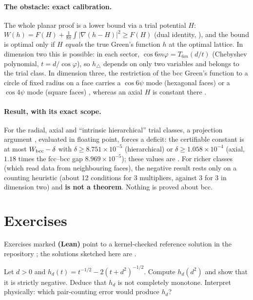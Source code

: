 \paragraph{The obstacle: exact calibration.} The whole planar proof is a lower bound via a trial potential $H$:
$W(h)=F(H)+\frac1{8\pi}\int|\nabla(h-H)|^2\ge F(H)$ (dual identity, \tierC), and the bound is optimal only if
$H$ \emph{equals} the true Green's function $h$ at the optimal lattice. In dimension two this is possible: in each sector,
$\cos6m\varphi=T_{6m}(d/t)$ (Chebyshev polynomial, $t=d/\cos\varphi$), so $h_\triangle$ depends on only two
variables and belongs to the trial class. In dimension three, the restriction of the bcc Green's function to a circle
of fixed radius on a face carries a $\cos6\psi$ mode (hexagonal faces) or a $\cos4\psi$ mode (square faces) \tierX, whereas
an axial $H$ is constant there \tierC.

\paragraph{Result, with its exact scope.} For the radial, axial and ``intrinsic hierarchical'' trial classes,
a projection argument \tierC, evaluated in floating point, forces a deficit: the certifiable constant is at most
$W_{\rm bcc}-\delta$ with $\delta\ge8.751\times10^{-5}$ (hierarchical) or $\delta\ge1.058\times10^{-4}$ (axial,
$1.18$ times the fcc--bcc gap $8.969\times10^{-5}$); these values are \tierX. For richer classes (which read
data from neighbouring faces), the negative result rests only on a counting heuristic (about 12 conditions for 3
multipliers, against 3 for 3 in dimension two) \tierC{} and \textbf{is not a theorem}. Nothing is proved about
bcc.

\section{Exercises}\label{ch2:sec:ex}

Exercises marked \textbf{(Lean)} point to a kernel-checked reference solution in the repository
\tierA{}; the solutions sketched here are \tierC.

\begin{exercise}\label{ch2:ex:hd}
Let $d>0$ and $h_d(t)=t^{-1/2}-2(t+d^2)^{-1/2}$. Compute $h_d(d^2)$ and show that it is strictly negative.
Deduce that $h_d$ is not completely monotone. Interpret physically: which pair-counting error would
produce $h_d$?
\end{exercise}

